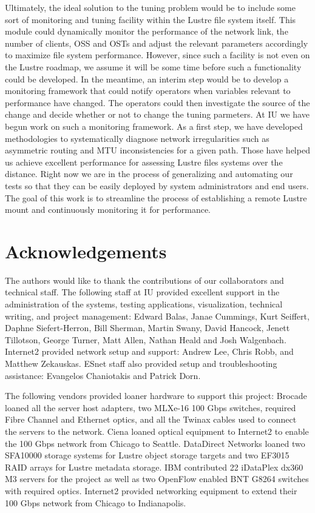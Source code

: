\documentclass[]{sig-alternate}
\begin{document}
Ultimately, the ideal solution to the tuning problem would be to include some sort of monitoring and tuning
facility within the Lustre file system itself. This module could dynamically monitor the performance of the
network link, the number of clients, OSS and OSTs and adjust the relevant parameters accordingly to maximize
file system performance. However, since such a facility is not even on the Lustre roadmap, we assume it will
be some time before such a functionality could be developed. In the meantime, an interim step would be to
develop a monitoring framework that could notify operators when variables relevant to performance have
changed. The operators could then investigate the source of the change and decide whether or not to change the
tuning parmeters. At IU we have begun work on such a monitoring framework. As a first step, we have developed
methodologies to systematically diagnose network irregularities such as asymmetric routing and MTU
inconsistencies for a given path. Those have helped us achieve excellent performance for assessing Lustre
files systems over the distance. Right now we are in the process of generalizing and automating our tests so
that they can be easily deployed by system administrators and end users. The goal of this work is to
streamline the process of establishing a remote Lustre mount and continuously monitoring it for performance.
  
\section{Acknowledgements}

The authors would like to thank the contributions of our collaborators and technical staff. The following
staff at IU provided excellent support in the administration of the systems, testing applications,
visualization, technical writing, and project management: Edward Balas, Janae Cummings, Kurt Seiffert, Daphne
Siefert-Herron, Bill Sherman, Martin Swany, David Hancock, Jenett Tillotson, George Turner, Matt Allen, Nathan Heald and Josh Walgenbach. Internet2 provided network setup and support: Andrew Lee, Chris Robb, and Matthew Zekauskas. ESnet staff also provided setup and troubleshooting assistance: Evangelos Chaniotakis and Patrick Dorn.

The following vendors provided loaner hardware to support this project: Brocade loaned all the server host
adapters, two MLXe-16 100 Gbps switches, required Fibre Channel and Ethernet optics, and all the Twinax cables
used to connect the servers to the network. Ciena loaned optical equipment to Internet2 to enable the 100 Gbps
network from Chicago to Seattle. DataDirect Networks loaned two SFA10000 storage systems for Lustre object
storage targets and two EF3015 RAID arrays for Lustre metadata storage. IBM contributed 22 iDataPlex dx360 M3
servers for the project as well as two OpenFlow enabled BNT G8264 switches with required optics. Internet2
provided networking equipment to extend their 100 Gbps network from Chicago to Indianapolis.
\newpage


\end{document}
